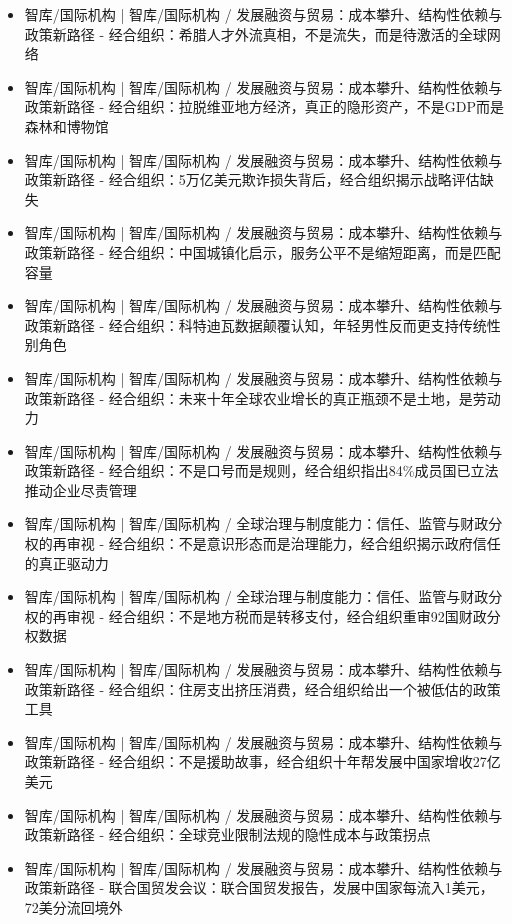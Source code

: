 \documentclass[11pt]{ctexart}
\begin{document}
\begin{itemize}
  \item [R013] 智库/国际机构 | 智库/国际机构 / 发展融资与贸易：成本攀升、结构性依赖与政策新路径 - 经合组织：希腊人才外流真相，不是流失，而是待激活的全球网络
  \item [R014] 智库/国际机构 | 智库/国际机构 / 发展融资与贸易：成本攀升、结构性依赖与政策新路径 - 经合组织：拉脱维亚地方经济，真正的隐形资产，不是GDP而是森林和博物馆
  \item [R015] 智库/国际机构 | 智库/国际机构 / 发展融资与贸易：成本攀升、结构性依赖与政策新路径 - 经合组织：5万亿美元欺诈损失背后，经合组织揭示战略评估缺失
  \item [R016] 智库/国际机构 | 智库/国际机构 / 发展融资与贸易：成本攀升、结构性依赖与政策新路径 - 经合组织：中国城镇化启示，服务公平不是缩短距离，而是匹配容量
  \item [R017] 智库/国际机构 | 智库/国际机构 / 发展融资与贸易：成本攀升、结构性依赖与政策新路径 - 经合组织：科特迪瓦数据颠覆认知，年轻男性反而更支持传统性别角色
  \item [R018] 智库/国际机构 | 智库/国际机构 / 发展融资与贸易：成本攀升、结构性依赖与政策新路径 - 经合组织：未来十年全球农业增长的真正瓶颈不是土地，是劳动力
  \item [R019] 智库/国际机构 | 智库/国际机构 / 发展融资与贸易：成本攀升、结构性依赖与政策新路径 - 经合组织：不是口号而是规则，经合组织指出84\%成员国已立法推动企业尽责管理
  \item [R020] 智库/国际机构 | 智库/国际机构 / 全球治理与制度能力：信任、监管与财政分权的再审视 - 经合组织：不是意识形态而是治理能力，经合组织揭示政府信任的真正驱动力
  \item [R021] 智库/国际机构 | 智库/国际机构 / 全球治理与制度能力：信任、监管与财政分权的再审视 - 经合组织：不是地方税而是转移支付，经合组织重审92国财政分权数据
  \item [R022] 智库/国际机构 | 智库/国际机构 / 发展融资与贸易：成本攀升、结构性依赖与政策新路径 - 经合组织：住房支出挤压消费，经合组织给出一个被低估的政策工具
  \item [R023] 智库/国际机构 | 智库/国际机构 / 发展融资与贸易：成本攀升、结构性依赖与政策新路径 - 经合组织：不是援助故事，经合组织十年帮发展中国家增收27亿美元
  \item [R024] 智库/国际机构 | 智库/国际机构 / 发展融资与贸易：成本攀升、结构性依赖与政策新路径 - 经合组织：全球竞业限制法规的隐性成本与政策拐点
  \item [R025] 智库/国际机构 | 智库/国际机构 / 发展融资与贸易：成本攀升、结构性依赖与政策新路径 - 联合国贸发会议：联合国贸发报告，发展中国家每流入1美元，72美分流回境外

\end{itemize}
\end{document}
